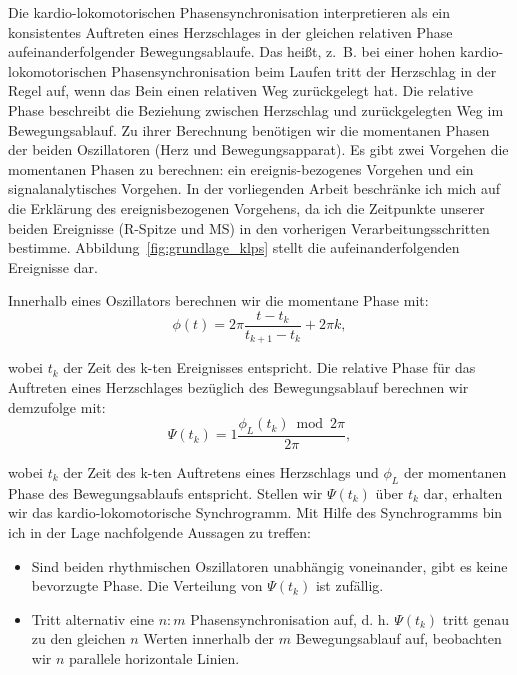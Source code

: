 Die kardio-lokomotorischen Phasensynchronisation interpretieren \citet[][S.~12]{Niizeki2014} als ein konsistentes Auftreten eines Herzschlages in der gleichen relativen Phase aufeinanderfolgender Bewegungsablaufe. Das heißt, z.~B. bei einer hohen kardio-lokomotorischen Phasensynchronisation beim Laufen tritt der Herzschlag in der Regel auf, wenn das Bein einen relativen Weg zurückgelegt hat. Die relative Phase beschreibt die Beziehung zwischen Herzschlag und zurückgelegten Weg im Bewegungsablauf. Zu ihrer Berechnung benötigen wir die momentanen Phasen der beiden Oszillatoren (Herz und Bewegungsapparat). Es gibt zwei Vorgehen die momentanen Phasen zu berechnen: ein ereignis-bezogenes Vorgehen und ein signalanalytisches Vorgehen. In der vorliegenden Arbeit beschränke ich mich auf die Erklärung des ereignisbezogenen Vorgehens, da ich die Zeitpunkte unserer beiden Ereignisse (R-Spitze und \ac{MS}) in den vorherigen Verarbeitungsschritten bestimme. Abbildung~\ref{fig:grundlage_klps} stellt die aufeinanderfolgenden Ereignisse dar.

Innerhalb eines Oszillators berechnen wir die momentane Phase mit: 
\begin{equation}
	\phi(t) = 2 \pi \frac{t-t_{k}}{t_{k+1}-t_{k}} + 2 \pi k, 
\end{equation}

wobei $t_{k}$ der Zeit des k-ten Ereignisses entspricht. Die relative Phase für das Auftreten eines Herzschlages bezüglich des Bewegungsablauf berechnen wir demzufolge mit: 
\begin{equation}
	\Psi(t_{k}) = 1 \frac{\phi_{L}(t_{k}) \bmod 2 \pi}{2 \pi}, 
\end{equation}

wobei $t_{k}$ der Zeit des k-ten Auftretens eines Herzschlags und $\phi_{L}$ der momentanen Phase des Bewegungsablaufs entspricht. Stellen wir $\Psi(t_{k})$ über $t_{k}$ dar, erhalten wir das kardio-lokomotorische Synchrogramm. Mit Hilfe des Synchrogramms bin ich in der Lage nachfolgende Aussagen zu treffen:
\begin{itemize}
	
	\item Sind beiden rhythmischen Oszillatoren unabhängig voneinander, gibt es keine bevorzugte Phase. Die Verteilung von $\Psi(t_{k})$ ist zufällig.
	
	\item Tritt alternativ eine $n:m$ Phasensynchronisation auf, d. h. $\Psi(t_{k})$ tritt genau zu den gleichen $n$ Werten innerhalb der $m$ Bewegungsablauf auf, beobachten wir $n$ parallele horizontale Linien.
\end{itemize}

